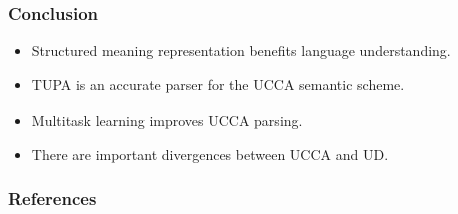 \documentclass[t,xcolor={svgnames,table}]{beamer}
\newcommand{\parser}[1]{TUPA\textsubscript{#1}}
\begin{document}
\section*{}

\begin{frame}
\frametitle{Conclusion}
\begin{itemize}
 \item Structured meaning representation benefits language understanding.
 \item \parser{} is an accurate parser for the UCCA semantic scheme.
 \item Multitask learning improves UCCA parsing.
 \item There are important divergences between UCCA and UD.
\end{itemize}
\end{frame}

\begin{frame}[allowframebreaks]
\frametitle{References}

\tiny
\end{frame}
\end{document}
